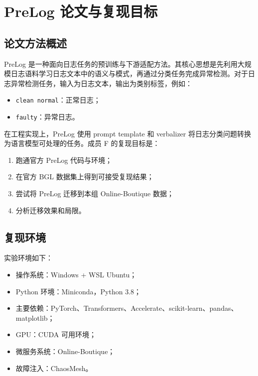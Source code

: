 \documentclass[UTF8,a4paper,12pt]{ctexart}
\begin{document}
\section{PreLog 论文与复现目标}

\subsection{论文方法概述}

PreLog 是一种面向日志任务的预训练与下游适配方法。其核心思想是先利用大规模日志语料学习日志文本中的语义与模式，再通过分类任务完成异常检测。对于日志异常检测任务，输入为日志文本，输出为类别标签，例如：

\begin{itemize}
    \item \texttt{clean normal}：正常日志；
    \item \texttt{faulty}：异常日志。
\end{itemize}

在工程实现上，PreLog 使用 prompt template 和 verbalizer 将日志分类问题转换为语言模型可处理的任务。成员 F 的复现目标是：

\begin{enumerate}[label=\arabic*.]
    \item 跑通官方 PreLog 代码与环境；
    \item 在官方 BGL 数据集上得到可接受复现结果；
    \item 尝试将 PreLog 迁移到本组 Online-Boutique 数据；
    \item 分析迁移效果和局限。
\end{enumerate}

\subsection{复现环境}

实验环境如下：

\begin{itemize}
    \item 操作系统：Windows + WSL Ubuntu；
    \item Python 环境：Miniconda，Python 3.8；
    \item 主要依赖：PyTorch、Transformers、Accelerate、scikit-learn、pandas、matplotlib；
    \item GPU：CUDA 可用环境；
    \item 微服务系统：Online-Boutique；
    \item 故障注入：ChaosMesh。
\end{itemize}
\end{document}
